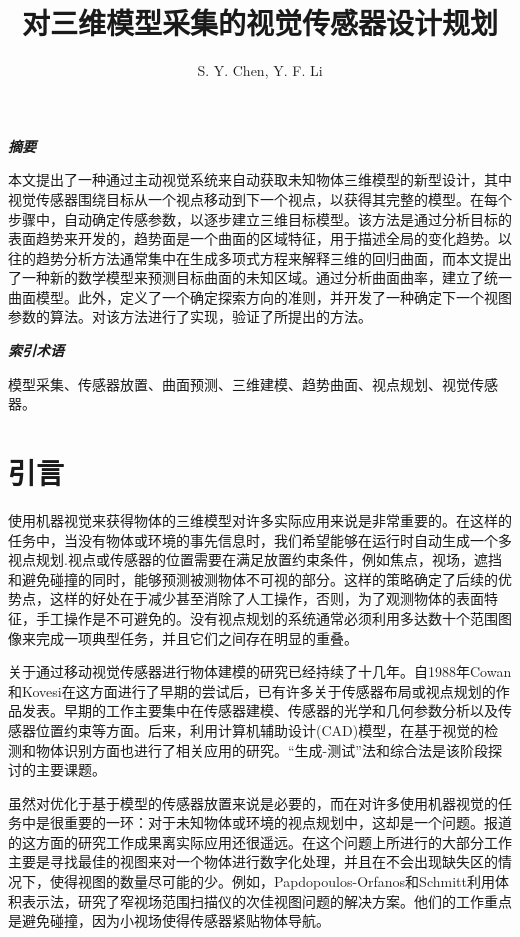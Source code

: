 \documentclass[AutoFakeBold,zihao=-4]{ctexart}
\title{\songti \bfseries \zihao{3} 对三维模型采集的视觉传感器设计规划}
\author{S. Y. Chen, Y. F. Li}
\date{}
\begin{document}
	\maketitle
	\textit{\songti \bfseries 摘要}
	
	本文提出了一种通过主动视觉系统来自动获取未知物体三维模型的新型设计，其中视觉传感器围绕目标从一个视点移动到下一个视点，以获得其完整的模型。在每个步骤中，自动确定传感参数，以逐步建立三维目标模型。该方法是通过分析目标的表面趋势来开发的，趋势面是一个曲面的区域特征，用于描述全局的变化趋势。以往的趋势分析方法通常集中在生成多项式方程来解释三维的回归曲面，而本文提出了一种新的数学模型来预测目标曲面的未知区域。通过分析曲面曲率，建立了统一曲面模型。此外，定义了一个确定探索方向的准则，并开发了一种确定下一个视图参数的算法。对该方法进行了实现，验证了所提出的方法。
	
	\textit{\songti \bfseries 索引术语}
	
	模型采集、传感器放置、曲面预测、三维建模、趋势曲面、视点规划、视觉传感器。

	\section{引言}
	使用机器视觉来获得物体的三维模型对许多实际应用来说是非常重要的。在这样的任务中，当没有物体或环境的事先信息时，我们希望能够在运行时自动生成一个多视点规划.视点或传感器的位置需要在满足放置约束条件，例如焦点，视场，遮挡和避免碰撞的同时，能够预测被测物体不可视的部分。这样的策略确定了后续的优势点，这样的好处在于减少甚至消除了人工操作，否则，为了观测物体的表面特征，手工操作是不可避免的。没有视点规划的系统通常必须利用多达数十个范围图像来完成一项典型任务，并且它们之间存在明显的重叠。
	
	关于通过移动视觉传感器进行物体建模的研究\cite{allen20033d}已经持续了十几年。自1988年Cowan和Kovesi\cite{cowan1988automatic}在这方面进行了早期的尝试后，已有许多关于传感器布局或视点规划的作品发表。早期的工作主要集中在传感器建模、传感器的光学和几何参数分析以及传感器位置约束等方面。后来，利用计算机辅助设计(CAD)模型，在基于视觉的检测和物体识别方面也进行了相关应用的研究。“生成-测试”法和综合法是该阶段探讨的主要课题。
	
	虽然对优化于基于模型的传感器放置来说是必要的\cite{chen2004automatic}，而在对许多使用机器视觉的任务中是很重要的一环：对于未知物体或环境的视点规划中，这却是一个问题。报道的这方面的研究工作成果离实际应用还很遥远。在这个问题上所进行的大部分工作主要是寻找最佳的视图来对一个物体进行数字化处理，并且在不会出现缺失区的情况下，使得视图的数量尽可能的少。例如，Papdopoulos-Orfanos和Schmitt\cite{papadopoulos1997automatic}利用体积表示法，研究了窄视场范围扫描仪的次佳视图问题的解决方案。他们的工作重点是避免碰撞，因为小视场使得传感器紧贴物体导航。
	
\end{document}
